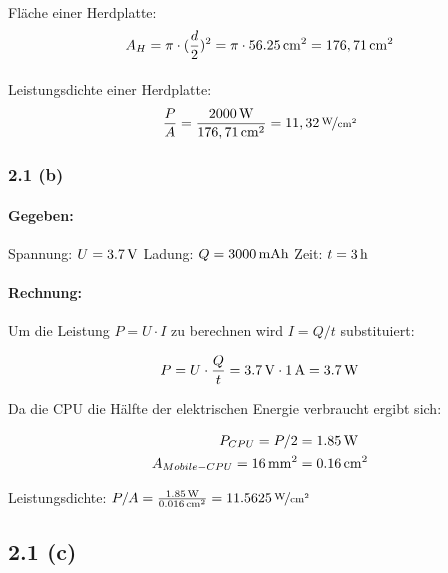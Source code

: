 \documentclass[11pt,a4paper]{article}
\begin{document}
\paragraph{}Fläche einer Herdplatte:
\begin{equation}
A_H = \pi\cdot(\frac{d}{2})^2 =  \pi\cdot\unit[56.25]{cm^2} = \unit[176,71]{cm^2}
\end{equation}

\paragraph{}Leistungsdichte einer Herdplatte:
\begin{equation}
\frac{P}{A} = \frac{\unit[2000]{W}}{\unit[176,71]{cm^2}} = \unitfrac[11,32]{W}{cm^2}
\end{equation}


\subsubsection{2.1 (b)}
\paragraph{Gegeben:}
Spannung: $U = \unit[3.7]{V}$
Ladung: $Q = \unit[3000]{mAh}$
Zeit: $t = \unit[3]{h}$

\paragraph{Rechnung:}
Um die Leistung $P = U \cdot I$ zu berechnen wird $I = Q/t$ substituiert:

\begin{equation}
P = U\cdot\frac{Q}{t} = \unit[3.7]{V} \cdot \unit[1]{A} = \unit[3.7]{W}
\end{equation}

Da die CPU die Hälfte der elektrischen Energie verbraucht ergibt sich:

\begin{align}
P_{CPU} = P/2 &= \unit[1.85]{W}\\
A_{Mobile-CPU} = \unit[16]{mm^2} &= \unit[0.16]{cm^2}
\end{align}


Leistungsdichte: $P/A = \frac{\unit[1.85]{W}}{\unit[0.016]{cm^2}} = \unitfrac[11.5625]{W}{cm^2}$

\subsection{2.1 (c)}
\end{document}
